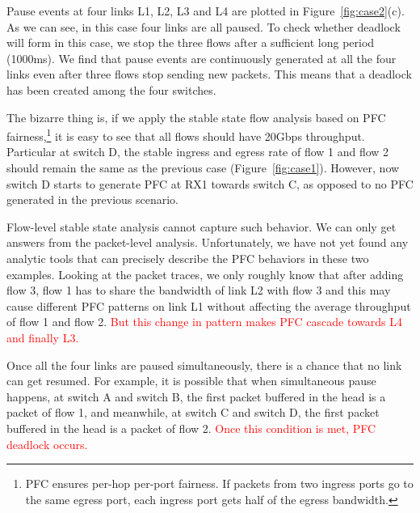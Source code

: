 Pause events at four links L1, L2, L3 and L4 are plotted in Figure~\ref{fig:case2}(c). As we can see, in
this case four links are all paused. To check whether deadlock will form in this case, we stop the three
flows after a sufficient long period (1000ms). We find that pause events are continuously
generated at all the four links even after three flows stop sending new packets.
This means that a deadlock has been created among the four switches.

The bizarre thing is, if we apply the stable state flow analysis based on PFC fairness,\footnote{PFC
ensures per-hop per-port fairness. If packets from two ingress ports go to the same egress port, each ingress
port gets half of the egress bandwidth.} it is easy to see that all flows should have 20Gbps throughput.
Particular at switch D, the stable ingress and egress rate of flow 1 and flow 2 should remain the same as
the previous case (Figure~\ref{fig:case1}). However, now switch D starts to generate PFC at RX1 towards
switch C, as opposed to no PFC generated in the previous scenario.


Flow-level stable state analysis cannot capture such behavior. We can only get answers from the
packet-level analysis. Unfortunately, we have not yet found any analytic tools that can precisely
describe the PFC behaviors in these two examples. Looking at the packet traces, we only roughly know that
after adding flow 3, flow 1 has to share the bandwidth of link L2 with flow 3 and this may cause
different PFC patterns on link L1 without affecting the average throughput of flow 1 and flow 2.
\textcolor{red}{But this change in pattern makes PFC cascade towards L4 and finally L3.}


Once all the four links are paused simultaneously, there is a chance that no link can get resumed.
For example, it is possible that when simultaneous pause happens, at switch A and switch B, the
first packet buffered in the head is a packet of flow 1, and meanwhile, at switch C and switch
D, the first packet buffered in the head is a packet of flow 2. \textcolor{red}{Once this condition is met, PFC deadlock occurs.} 

